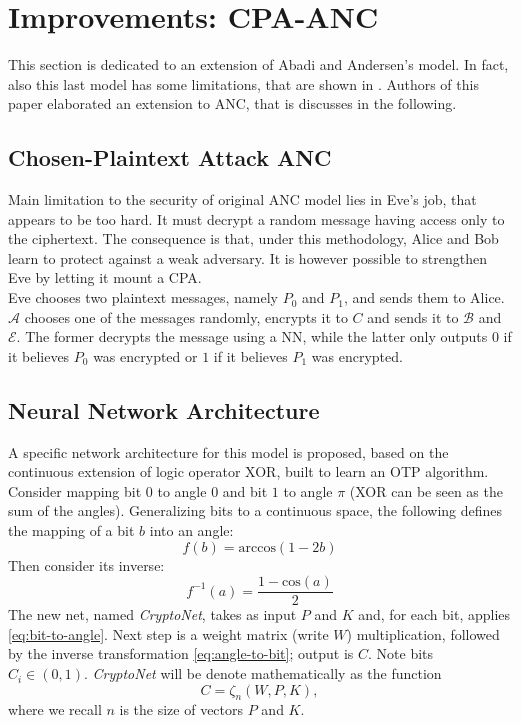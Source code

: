 \documentclass[%
    corpo=11pt,
    twoside,
    stile=classica,
    oldstyle,
    autoretitolo,
    tipotesi=magistrale,
    greek,
    evenboxes,
    english
]{toptesi}
\begin{document}
\section{Improvements: CPA-ANC}
This section is dedicated to an extension of Abadi and Andersen's model. In fact, also this last model has some limitations, that are shown in \cite{brazilians}. Authors of this paper elaborated an extension to ANC, that is discusses in the following.

\subsection{Chosen-Plaintext Attack ANC}
\label{cpaanc}
Main limitation to the security of original ANC model lies in Eve's job, that appears to be too hard. It must decrypt a random message having access only to the ciphertext. The consequence is that, under this methodology, Alice and Bob learn to protect against a weak adversary. It is however possible to strengthen Eve by letting it mount a CPA.  \\
Eve chooses two plaintext messages, namely $P_0$ and $P_1$, and sends them to Alice. $\mathcal{A}$ chooses one of the messages randomly, encrypts it to $C$ and sends it to $\mathcal{B}$ and $\mathcal{E}$. The former decrypts the message using a NN, while the latter only outputs $0$ if it believes $P_0$ was encrypted or $1$ if it believes $P_1$ was encrypted.

\subsection{Neural Network Architecture}
A specific network architecture for this model is proposed, based on the continuous extension of logic operator XOR, built to learn an OTP algorithm. \\
Consider mapping bit $0$ to angle $0$ and bit $1$ to angle $\pi$ (XOR can be seen as the sum of the angles). Generalizing bits to a continuous space, the following defines the mapping of a bit $b$ into an angle: 
\begin{equation}
\label{eq:bit-to-angle}
f(b) = \text{arccos}(1 - 2b)
\end{equation}
Then consider its inverse:
\begin{equation}
\label{eq:angle-to-bit}
f^{-1}(a) = \frac{1 - \text{cos}(a)}{2}
\end{equation}
The new net, named \textit{CryptoNet}, takes as input $P$ and $K$ and, for each bit, applies \eqref{eq:bit-to-angle}. Next step is a weight matrix (write $W$) multiplication, followed by the inverse transformation \eqref{eq:angle-to-bit}; output is $C$. Note bits $C_i \in (0,1)$. \textit{CryptoNet} will be denote mathematically as the function
\begin{equation}
C = \zeta_n(W, P, K),
\end{equation}
where we recall $n$ is the size of vectors $P$ and $K$.
\end{document}
